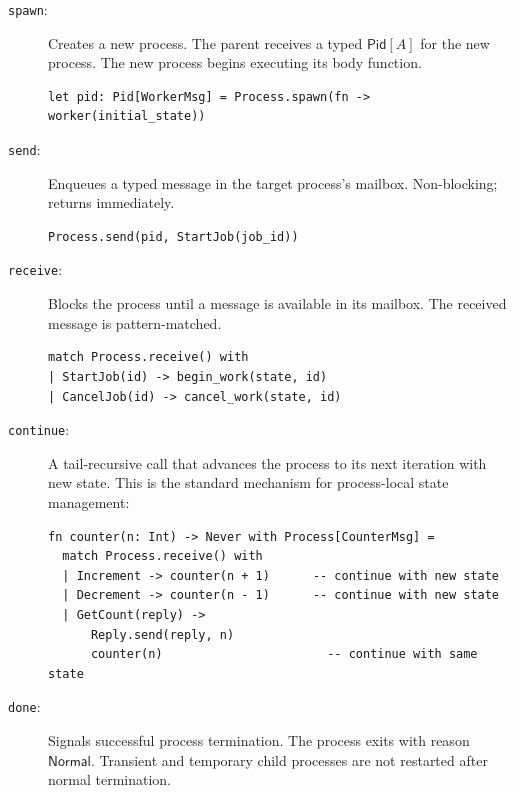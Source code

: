 \documentclass[11pt,a4paper]{article}
\newcommand{\Pid}{\mathsf{Pid}}
\begin{document}
\begin{description}
\item[\texttt{spawn}:] Creates a new process. The parent receives a typed $\Pid[A]$ for the new process. The new process begins executing its body function.

\begin{lstlisting}[language=japl,caption={Spawning a process}]
let pid: Pid[WorkerMsg] = Process.spawn(fn -> worker(initial_state))
\end{lstlisting}

\item[\texttt{send}:] Enqueues a typed message in the target process's mailbox. Non-blocking; returns immediately.

\begin{lstlisting}[language=japl,caption={Sending a message}]
Process.send(pid, StartJob(job_id))
\end{lstlisting}

\item[\texttt{receive}:] Blocks the process until a message is available in its mailbox. The received message is pattern-matched.

\begin{lstlisting}[language=japl,caption={Receiving with pattern matching}]
match Process.receive() with
| StartJob(id) -> begin_work(state, id)
| CancelJob(id) -> cancel_work(state, id)
\end{lstlisting}

\item[\texttt{continue}:] A tail-recursive call that advances the process to its next iteration with new state. This is the standard mechanism for process-local state management:

\begin{lstlisting}[language=japl,caption={State evolution through tail recursion}]
fn counter(n: Int) -> Never with Process[CounterMsg] =
  match Process.receive() with
  | Increment -> counter(n + 1)      -- continue with new state
  | Decrement -> counter(n - 1)      -- continue with new state
  | GetCount(reply) ->
      Reply.send(reply, n)
      counter(n)                       -- continue with same state
\end{lstlisting}

\item[\texttt{done}:] Signals successful process termination. The process exits with reason $\mathsf{Normal}$. Transient and temporary child processes are not restarted after normal termination.


\end{description}
\end{document}
